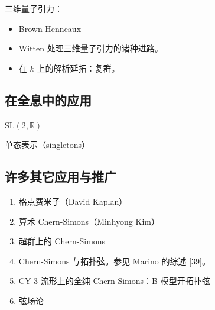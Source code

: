 三维量子引力：
\begin{itemize}[label={}]
  \item Brown-Henneaux
  \item Witten 处理三维量子引力的诸种进路。
  \item 在 $k$ 上的解析延拓：复群。
\end{itemize}


\subsection{在全息中的应用} %

$\mathrm{SL}(2,\mathbb{R})$

单态表示（singletons）


\subsection{许多其它应用与推广} %

\begin{enumerate}
  \item 格点费米子（David Kaplan）
  \item 算术 Chern-Simons（Minhyong Kim）
  \item 超群上的 Chern-Simons
  \item Chern-Simons 与拓扑弦。参见 Marino 的综述 [39]。
  \item CY 3-流形上的全纯 Chern-Simons：B 模型开拓扑弦
  \item 弦场论
\end{enumerate}

